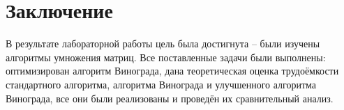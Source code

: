 \chapter*{Заключение}
\label{cha:conclusion}
В результате лабораторной работы цель была достигнута -- были изучены алгоритмы умножения матриц. Все поставленные задачи были выполнены: оптимизирован алгоритм Винограда, дана теоретическая оценка трудоёмкости стандартного алгоритма, алгоритма Винограда и улучшенного алгоритма Винограда, все они были реализованы и проведён их сравнительный анализ.